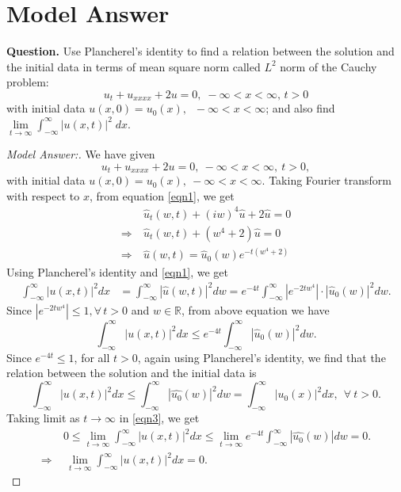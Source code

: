 \documentclass[12pt,leqno]{amsart}
\newcommand{\bb}[1]{\mathbb{#1}}
\numberwithin{equation}{section}
\theoremstyle{definition}
\begin{document}
\date{\today}

\baselineskip=16pt
\section{Model Answer}
\noindent
{\bf Question.} 
Use Plancherel's identity to find a relation between the solution and the initial data 
in terms of mean square norm called \(L^2\) norm of the Cauchy problem: 
$$u_t+u_{xxxx} +2u=0,\;-\infty < x < \infty,\, t>0$$ 
with initial data \(u(x,0)=u_0(x),\;\; -\infty < x < \infty\); and also find 
$\lim\limits_{t\to\infty} \int_{-\infty}^{\infty} |u(x,t)|^2\;dx$.

\begin{proof}[Model Answer:]
We have given 
\begin{equation}\label{eqn1}
u_t + u_{xxxx} + 2u = 0,\ -\infty < x < \infty,\ t > 0, 
\end{equation}
with initial data $u(x, 0) = u_0(x),\ -\infty < x < \infty$. 
Taking Fourier transform with respect to $x$, from equation \eqref{eqn1}, we get 
\begin{align}
&\ \widehat{u}_t(w, t) + (iw)^4\widehat{u} + 2\widehat{u} = 0 \nonumber \\
\Longrightarrow &\ \widehat{u}_t(w, t) + (w^4+2)\widehat{u} = 0 \nonumber \\ 
\Longrightarrow &\ \widehat{u}(w, t) = \widehat{u}_0(w) e^{-t(w^4+2)} \label{eqn2}
\end{align}
Using Plancherel's identity and \eqref{eqn1}, we get 
\begin{align*}
\int_{-\infty}^\infty |u(x, t)|^2 dx & = \int_{-\infty}^\infty |\widehat{u}(w, t)|^2 dw 
= e^{-4t} \int_{-\infty}^\infty |e^{-2tw^4}|\cdot |\widehat{u}_0(w)|^2dw. %
\end{align*}
Since $|e^{-2tw^4}| \leq 1, \forall\, t > 0$ and $w \in \bb R$, from above equation we have 
\begin{equation}\label{eqn3}
	\int_{-\infty}^\infty |u(x, t)|^2 dx \leq e^{-4t} \int_{-\infty}^\infty |\widehat{u}_0(w)|^2 dw. 
\end{equation}
Since $e^{-4t} \leq 1$, for all $t > 0$, again using Plancherel's identity, 
we find that the relation between the solution and the initial data is 
$$\int_{-\infty}^{\infty} |u(x,t)|^2 dx 
\leq \int_{-\infty}^{\infty} |\widehat{u_0}(w)|^2 dw 
= \int_{-\infty}^\infty |u_0(x)|^2 dx,\ \ \forall\ t > 0.$$ 
Taking limit as $t \to \infty$ in \eqref{eqn3}, we get 
\begin{align}
	& \ 0 \leq \lim\limits_{t\to\infty} \int_{-\infty}^{\infty} |u(x, t)|^2 dx 
	\leq \lim\limits_{t\to\infty} e^{-4t}\int_{-\infty}^{\infty} |\widehat{u_0}(w)| dw = 0. \nonumber \\ 
	\Longrightarrow & \ \ \lim\limits_{t\to\infty} \int_{-\infty}^{\infty} |u(x, t)|^2 dx  = 0. \nonumber
\end{align}
\end{proof}


\date{\today}
\end{document}
